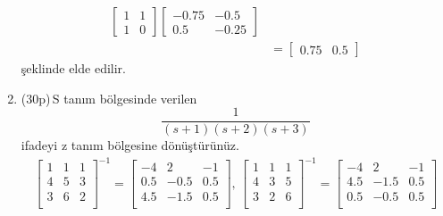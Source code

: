 \begin{enumerate}[\bfseries S1.]
\begin{equation}
\begin{split}
\begin{bmatrix}
                1&     1\\
                1&     0
            \end{bmatrix}\begin{bmatrix}
                -0.75&   -0.5\\
                0.5&   -0.25
            \end{bmatrix}\\
            &=\begin{bmatrix}0.75& 0.5\end{bmatrix}
        \end{split}
    \end{equation}
    şeklinde elde edilir.

    \item (30p)\,S tanım bölgesinde verilen 
    \begin{equation}
        \frac{1}{(s+1)(s+2)(s+3)}
    \end{equation}
    ifadeyi z tanım bölgesine dönüştürünüz. 
    \begin{equation*}
        \begin{split}
            \begin{bmatrix}
                1&     1&     1\\
                4&     5&     3\\
                3&     6&     2\\
            \end{bmatrix}^{-1}=\begin{bmatrix}
                -4 &   2   &    -1\\
                0.5&   -0.5&    0.5\\
                4.5&   -1.5&    0.5\\
            \end{bmatrix},\,
            \begin{bmatrix}
                1&     1&     1\\
                4&     3&     5\\
                3&     2&     6\\
            \end{bmatrix}^{-1}=\begin{bmatrix}
                -4&    2&   -1\\
                4.5&   -1.5&    0.5\\
                0.5&  -0.5&    0.5\\
            \end{bmatrix}\\

\end{split}
\end{equation*}
\end{enumerate}
